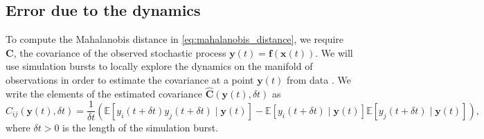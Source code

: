 \subsection{Error due to the dynamics} \label{subsec:cov_est}

To compute the Mahalanobis distance in \eqref{eq:mahalanobis_distance}, we require $\mathbf{C}$, the covariance of the observed stochastic process $\mathbf{y}(t) = \mathbf{f}( \mathbf{x}(t))$.
%
We will use simulation bursts to locally explore the dynamics on the manifold of observations in order to estimate the covariance at a point $\mathbf{y}(t)$ from data \cite{talmon2014manifold, talmon2014intrinsic}.
%
We write the elements of the estimated covariance $\hat{\mathbf{C}}(\mathbf{y}(t), \delta t)$ as
\begin{equation}\label{eq:estimated_cov_expected_value}
\hat{C}_{ij}(\mathbf{y}(t), \delta t)
=
\frac{1}{\delta t} \left( \mathbb{E} \left[ y_i (t+\delta t) y_j (t+ \delta t) \mid \mathbf{y}(t) \right]
- \mathbb{E} \left[ y_i (t+\delta t) \mid \mathbf{y}(t) \right] \mathbb{E} \left[ y_j (t+\delta t) \mid \mathbf{y}(t) \right] \right) ,
\end{equation}
%
where $\delta t > 0$ is the length of the simulation burst.


